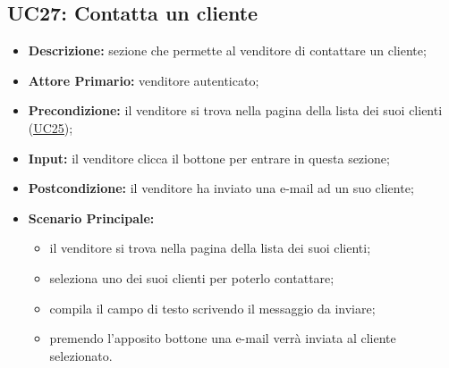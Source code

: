 \subsection{UC27: Contatta un cliente}
\label{sec:UC27}
\begin{itemize}
    \item \textbf{Descrizione:} sezione che permette al venditore di contattare un cliente;
    \item \textbf{Attore Primario:} venditore autenticato;
    \item \textbf{Precondizione:} il venditore si trova nella pagina della lista dei suoi clienti (\hyperref[sec:UC25]{\underline{UC25}});
    \item \textbf{Input:} il venditore clicca il bottone per entrare in questa sezione;
    \item \textbf{Postcondizione:} il venditore ha inviato una e-mail ad un suo cliente;
    \item \textbf{Scenario Principale:}
          \begin{itemize}
              \item il venditore si trova nella pagina della lista dei suoi clienti;
              \item seleziona uno dei suoi clienti per poterlo contattare;
              \item compila il campo di testo scrivendo il messaggio da inviare;
              \item premendo l'apposito bottone una e-mail verrà inviata al cliente selezionato.
          \end{itemize}
\end{itemize}